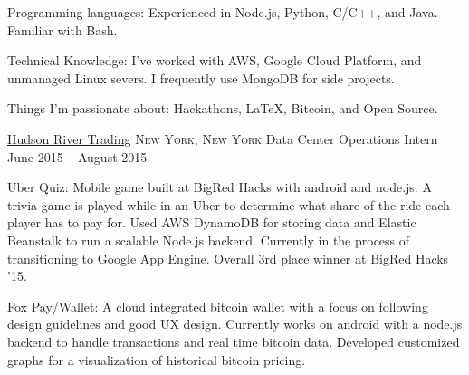 \documentclass[11pt]{article}
\begin{document}
\inlineheadsection  %
  {Programming languages:}
  {Experienced in Node.js, Python, C/C++, and Java. Familiar with Bash.}


\inlineheadsection
  {Technical Knowledge:}
  { I've worked with AWS, Google Cloud Platform, and unmanaged Linux severs.  I frequently use MongoDB for side projects. }

\inlineheadsection
  {Things I'm passionate about:}
  {Hackathons, \LaTeX, Bitcoin, and Open Source.}


\vspace{0.5em}


\spacedhrule{0.1em}{0.9em}  %


\headedsection  %
{\href{http://www.hudson-trading.com/}{Hudson River Trading}}
{\textsc{New York, New York}} {
	\headedsubsection
	{Data Center Operations Intern}
	{June 2015 -- August 2015}
	{
	}
}


\spacedhrule{0.1em}{0.9em}  %

\inlineheadsection
  {Uber Quiz:}
  { Mobile game built at BigRed Hacks with android and node.js.  A trivia game is played while in an Uber to determine what share of the ride each player has to pay for.  Used AWS DynamoDB for storing data and Elastic Beanstalk to run a scalable Node.js backend.  Currently in the process of transitioning to Google App Engine.  Overall 3rd place winner at BigRed Hacks '15. }

\inlineheadsection  %
  {Fox Pay/Wallet:}
  { A cloud integrated bitcoin wallet with a focus on following design guidelines and good UX design.  Currently works on android with a node.js backend to handle transactions and real time bitcoin data.  Developed customized graphs for a visualization of historical bitcoin pricing. }
\end{document}
